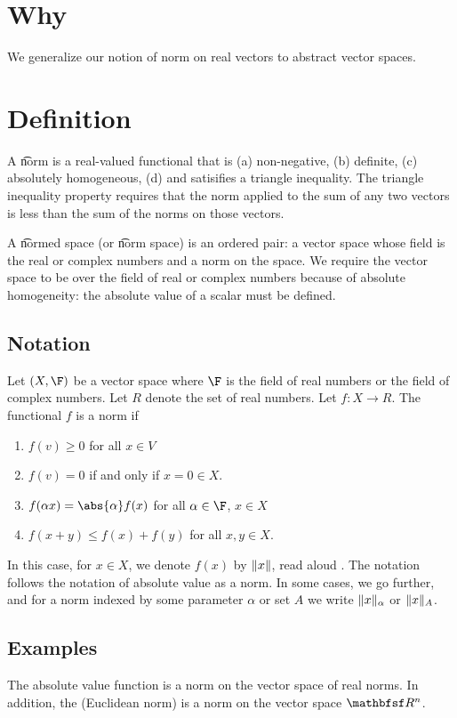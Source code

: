 
\section*{Why}

We generalize our notion of norm on real vectors to abstract vector spaces.

\section*{Definition}

A \t{norm} is a real-valued functional that is
(a) non-negative,
(b) definite,
(c) absolutely homogeneous,
(d) and satisifies a triangle inequality.
The triangle inequality property requires that the norm applied to the sum of any two vectors is less than the sum of the norms on those vectors.

A \t{normed space} (or \t{norm space}) is an ordered pair: a vector space whose field is the real or complex numbers and a norm on the space.
We require the vector space to be over the field of real or complex numbers because of absolute homogeneity: the absolute value of a scalar must be defined.

\subsection*{Notation}

Let $(X, \F )$ be a vector space where $\F $ is the field of real numbers or the field of complex numbers.
Let $R$ denote the set of real numbers.
Let $f: X \to R$.
The functional $f$ is a norm if
  \begin{enumerate}
  \item $f(v) \geq 0$ for all $x \in V$
  \item $f(v) = 0$ if and only if $x = 0 \in X$.
  \item $f(\alpha  x) = \abs{\alpha }f(x)$ for all $\alpha  \in \F $, $x \in X$
  \item $f(x + y) \leq f(x) + f(y)$ for all $x, y \in X$.
  \end{enumerate}

In this case, for $x \in X$, we denote $f(x)$ by $\lVert x\rVert$, read aloud .
The notation follows the notation of absolute value as a norm.
In some cases, we go further, and for a norm indexed by some parameter $\alpha $ or set $A$ we write $\lVert x\rVert_\alpha $ or $\lVert x\rVert_A$.

\subsection*{Examples}

The absolute value function is a norm on the vector space of real norms.
In addition, the (Euclidean norm) is a norm on the vector space $\R ^n$.
